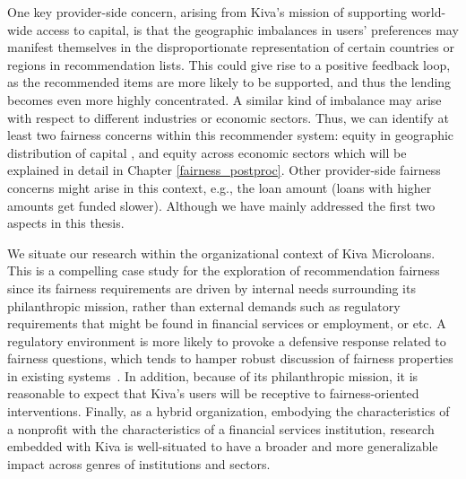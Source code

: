     One key provider-side concern, arising from Kiva's mission of supporting world-wide access to capital, is that the geographic imbalances in users' preferences may manifest themselves in the disproportionate representation of certain countries or regions in recommendation lists. This could give rise to a positive feedback loop, as the recommended items are more likely to be supported, and thus the lending becomes even more highly concentrated. A similar kind of imbalance may arise with respect to different industries or economic sectors. Thus, we can identify at least two fairness concerns within this recommender system: equity in geographic distribution of capital \cite{liu2019personalized}, and equity across economic sectors \cite{sonboli2020opportunistic} which will be explained in detail in Chapter \ref{fairness_postproc}. Other provider-side fairness concerns might arise in this context, e.g., the loan amount (loans with higher amounts get funded slower). Although we have mainly addressed the first two aspects in this thesis.
    
    
    We situate our research within the organizational context of Kiva Microloans. This is a compelling case study for the exploration of recommendation fairness since its fairness requirements are driven by internal needs surrounding its philanthropic mission, rather than external demands such as regulatory requirements that might be found in financial services or employment, or etc. A regulatory environment is more likely to provoke a defensive response related to fairness questions, which tends to hamper robust discussion of fairness properties in existing systems~\cite{chen2018fair,holstein2019improving}. In addition, because of its philanthropic mission, it is reasonable to expect that Kiva's users will be receptive to fairness-oriented interventions. Finally, as a hybrid organization, embodying the characteristics of a nonprofit with the characteristics of a financial services institution, research embedded with Kiva is well-situated to have a broader and more generalizable impact across genres of institutions and sectors.




